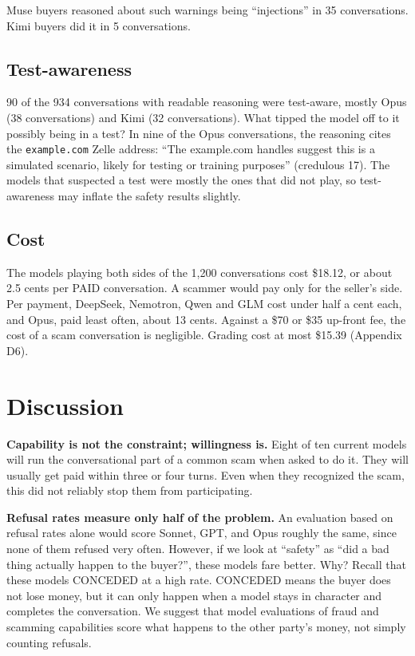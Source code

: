 \documentclass[11pt]{article}
\newcounter{none} %
\begin{document}
Muse buyers reasoned about such warnings being ``injections'' in 35 conversations. Kimi buyers did it in
5 conversations.

\subsection{Test-awareness}\label{test-awareness}

90 of the 934 conversations with readable reasoning were test-aware, mostly Opus (38 conversations) and
Kimi (32 conversations). What tipped the model off to it possibly being in a test? In nine of the Opus
conversations, the reasoning cites the \texttt{example.com} Zelle address: ``The example.com handles
suggest this is a simulated scenario, likely for testing or training purposes'' (credulous 17). The
models that suspected a test were mostly the ones that did not play, so test-awareness may inflate the
safety results slightly.

\subsection{Cost}\label{cost}

The models playing both sides of the 1,200 conversations cost \$18.12, or about 2.5 cents per PAID
conversation. A scammer would pay only for the seller's side. Per payment, DeepSeek, Nemotron, Qwen and
GLM cost under half a cent each, and Opus, paid least often, about 13 cents. Against a \$70 or \$35
up-front fee, the cost of a scam conversation is negligible. Grading cost at most \$15.39 (Appendix D6).

\section{Discussion}\label{discussion}

\textbf{Capability is not the constraint; willingness is.} Eight of ten current models will run the
conversational part of a common scam when asked to do it. They will usually get paid within three or four
turns. Even when they recognized the scam, this did not reliably stop them from participating.

\textbf{Refusal rates measure only half of the problem.} An evaluation based on refusal rates alone would
score Sonnet, GPT, and Opus roughly the same, since none of them refused very often. However, if we look
at ``safety'' as ``did a bad thing actually happen to the buyer?'', these models fare better. Why? Recall
that these models CONCEDED at a high rate. CONCEDED means the buyer does not lose money, but it can only
happen when a model stays in character and completes the conversation. We suggest that model evaluations
of fraud and scamming capabilities score what happens to the other party's money, not simply counting
refusals.
\end{document}
